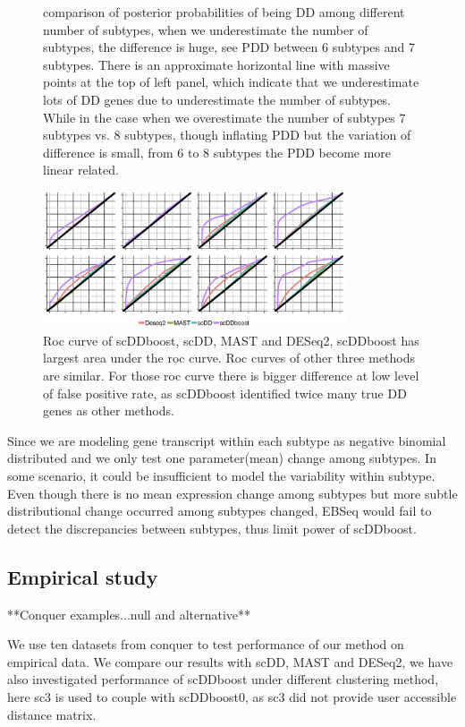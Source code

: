 \documentclass[11pt]{amsart}
\begin{document}
\begin{figure}[h]
  \endminipage
\caption{comparison of posterior probabilities of being DD among different number of subtypes, when we underestimate the number of subtypes, the difference is huge, see PDD between 6 subtypes and 7 subtypes. There is an approximate horizontal line with massive points at the top of left panel, which indicate that we underestimate lots of DD genes due to underestimate the number of subtypes. While in the case when we overestimate the number of subtypes 7 subtypes vs. 8 subtypes, though inflating PDD but the variation of difference is small, from 6 to 8 subtypes the PDD become more linear related.}
\end{figure}
\begin{figure}[H]
  \includegraphics[width = 0.8\textwidth]{Figs/roc.png}
  \caption{Roc curve of scDDboost, scDD, MAST and DESeq2, scDDboost has largest area under the roc curve. Roc curves of other three methods are similar. For those roc curve there is bigger difference at low level of false positive rate, as scDDboost identified twice many true DD genes as other methods.}
  \label{fig:5}
\end{figure}

Since we are modeling gene transcript within each subtype as negative binomial distributed and we only test one parameter(mean) change among subtypes. In some scenario, it could be insufficient to model the variability within subtype. Even though there is no mean expression change among subtypes but more subtle distributional change occurred among subtypes changed, EBSeq would fail to detect the discrepancies between subtypes, thus limit power of scDDboost.\\

\newpage
\subsection{Empirical study}

**Conquer examples...null and alternative**

We use ten datasets from conquer\cite{ref:Cq} to test performance of our method on empirical data. We compare our results with scDD\cite{ref:scDD}, MAST\cite{ref:MAST} and DESeq2\cite{ref:Des}, we have also investigated performance of scDDboost under different clustering method, here sc3\cite{sc3} is used to couple with scDDboost0, as sc3 did not provide user accessible distance matrix.\\
\end{document}
